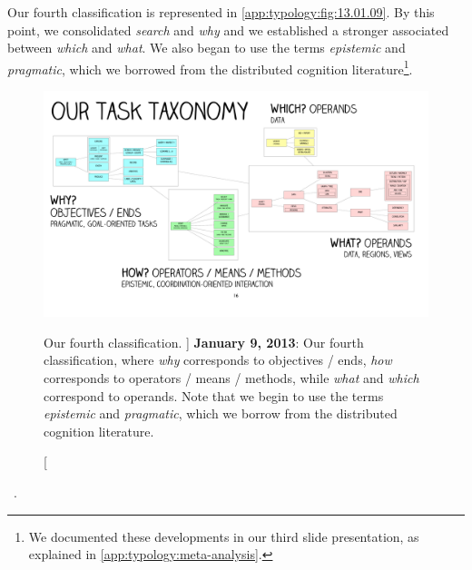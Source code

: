 Our fourth classification is represented in \autoref{app:typology:fig:13.01.09}.
By this point, we consolidated {\it search} and {\it why} and we established a stronger associated between {\it which} and {\it what}.
We also began to use the terms {\it  epistemic} and {\it pragmatic}, which we borrowed from the distributed cognition literature\footnote{We documented these developments in our third slide presentation, as explained in \autoref{app:typology:meta-analysis}.}.


\begin{figure}
	\centering
	\includegraphics[width=\textwidth]{figures/typology-13-01-09.pdf}
	\caption
	[
	    Our fourth classification.
	]
	{
	    {\bf January 9, 2013}: Our fourth classification, where \textsl{why} corresponds to objectives / ends, \textsl{how} corresponds to operators / means / methods, while \textsl{what} and \textsl{which} correspond to operands. Note that we begin to use the terms {\it epistemic} and {\it pragmatic}, which we borrow from the distributed cognition literature.
	}
	\centering
	\label{app:typology:fig:13.01.09}
\end{figure}


\begin{sloppypar}
~\cite{Norman1988}. \end{sloppypar}

